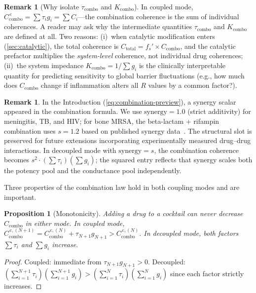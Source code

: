 \documentclass[11pt]{article}
\theoremstyle{plain}
\newtheorem{proposition}[theorem]{Proposition}
\theoremstyle{definition}
\newtheorem{remark}[theorem]{Remark}
\newcommand{\Ccombo}{C_{\mathrm{combo}}}
\begin{document}
\begin{remark}[Why isolate $\tau_{\mathrm{combo}}$ and $K_{\mathrm{combo}}$]
\label{rem:decomposition}
In coupled mode, $\Ccombo^{\,\mathrm{c}} = \sum \tau_i g_i =
\sum C_i$---the combination coherence is the sum of individual
coherences. A reader may ask why the intermediate quantities
$\tau_{\mathrm{combo}}$ and $K_{\mathrm{combo}}$ are defined at all.
Two reasons: (i)~when catalytic modification enters
(\cref{sec:catalytic}), the total coherence is
$C_{\mathrm{total}} = f_s' \times \Ccombo$, and the catalytic
prefactor multiplies the \emph{system-level} coherence, not
individual drug coherences; (ii)~the system impedance
$K_{\mathrm{combo}} = 1/\sum g_i$ is the clinically interpretable
quantity for predicting sensitivity to global barrier
fluctuations (e.g., how much does $\Ccombo$ change if inflammation
alters all $R$ values by a common factor?).
\end{remark}

\begin{remark}
In the Introduction (\cref{eq:combination-preview}), a synergy
scalar appeared in the combination formula. We use
$\mathrm{synergy} = 1.0$ (strict additivity) for meningitis, TB,
and HIV; for bone MRSA, the beta-lactam + rifampin combination
uses $s = 1.2$ based on published synergy data~\cite{Barber2015}.
The structural slot
is preserved for future extensions incorporating experimentally
measured drug--drug interactions. In decoupled mode with
$\mathrm{synergy} = s$, the combination coherence becomes
$s^2 \cdot (\sum \tau_i)(\sum g_i)$; the squared entry reflects
that synergy scales both the potency pool and the conductance pool
independently.
\end{remark}

Three properties of the combination law hold in both coupling modes
and are important.

\begin{proposition}[Monotonicity]
\label{prop:monotonicity}
Adding a drug to a cocktail can never decrease $\Ccombo$ in either
mode. In coupled mode,
$\Ccombo^{\,\mathrm{c},(N+1)} = \Ccombo^{\,\mathrm{c},(N)}
+ \tau_{N+1} g_{N+1} > \Ccombo^{\,\mathrm{c},(N)}$.
In decoupled mode, both factors $\sum \tau_i$ and $\sum g_i$
increase.
\end{proposition}

\begin{proof}
Coupled: immediate from $\tau_{N+1} g_{N+1} > 0$.
Decoupled: $(\sum_{i=1}^{N+1} \tau_i)(\sum_{i=1}^{N+1} g_i)
> (\sum_{i=1}^{N} \tau_i)(\sum_{i=1}^{N} g_i)$
since each factor strictly increases.
\end{proof}
\end{document}
